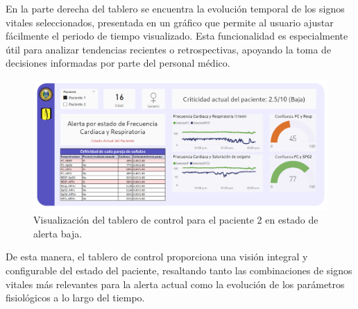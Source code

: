 En la parte derecha del tablero se encuentra la evolución temporal de los signos vitales seleccionados, presentada en un gráfico que permite al usuario ajustar fácilmente el periodo de tiempo visualizado. Esta funcionalidad es especialmente útil para analizar tendencias recientes o retrospectivas, apoyando la toma de decisiones informadas por parte del personal médico.

\begin{figure}[ht] \centering \includegraphics[width=\textwidth]{Images/TableroControl.png} \caption{Visualización del tablero de control para el paciente 2 en estado de alerta baja.} \label{fig:patient2_dashboard_baja_alerta}
\end{figure}

De esta manera, el tablero de control proporciona una visión integral y configurable del estado del paciente, resaltando tanto las combinaciones de signos vitales más relevantes para la alerta actual como la evolución de los parámetros fisiológicos a lo largo del tiempo.